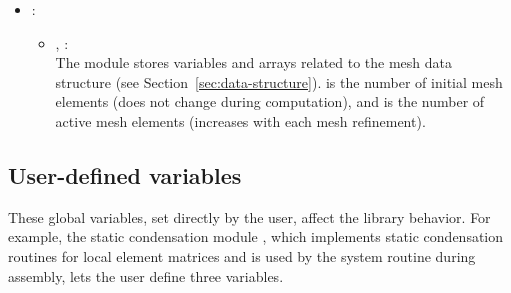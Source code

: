 \begin{itemize}
{\begin{itemize}
{			}
		\end{itemize}
	} 
	\item
	{
		 :
		\begin{itemize}
			\item {, :\\
			The  module stores variables and arrays related to the mesh data structure (see Section~\ref{sec:data-structure}).  is the number of initial mesh elements (does not change during computation), and  is the number of active mesh elements (increases with each mesh refinement).
			}
		\end{itemize}
	}
\end{itemize}

\subsection{User-defined variables}

These global variables, set directly by the user, affect the library behavior. For example, the static condensation module , which implements static condensation routines for local element matrices and is used by the system routine  during assembly, lets the user define three variables.

